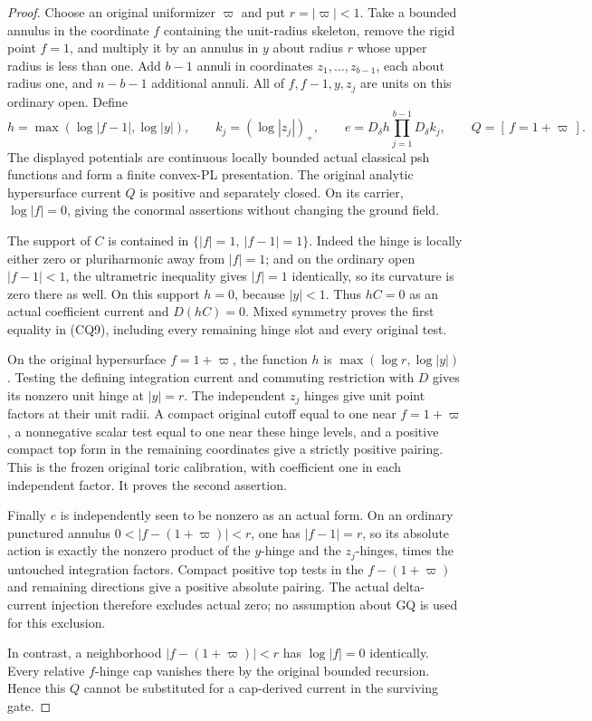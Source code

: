\documentclass[11pt,a4paper]{article}
\numberwithin{equation}{section}
\theoremstyle{definition}
\theoremstyle{remark}
\begin{document}
\begin{proof}
Choose an original uniformizer \(\varpi\) and put \(r=|\varpi|<1\).
Take a bounded annulus in the coordinate \(f\) containing the
unit-radius skeleton, remove the rigid point \(f=1\), and multiply
it by an annulus in \(y\) about radius \(r\) whose upper radius
is less than one. Add \(b-1\) annuli in coordinates
\(z_1,\ldots,z_{b-1}\), each about radius one, and \(n-b-1\)
additional annuli. All of \(f,f-1,y,z_j\) are units on this
ordinary open. Define
\[
 h=\max(\log|f-1|,\log|y|),\qquad
 k_j=(\log|z_j|)_+,\qquad
 e=D_\delta h\prod_{j=1}^{b-1}D_\delta k_j,\qquad
 Q=[\,f=1+\varpi\,].
 \tag{CQ10}
\]
The displayed potentials are continuous locally bounded actual
classical psh functions and form a finite convex-PL presentation.
The original analytic hypersurface current \(Q\) is positive and
separately closed. On its carrier, \(\log|f|=0\), giving the
conormal assertions without changing the ground field.

The support of \(C\) is contained in
\(\{|f|=1,\ |f-1|=1\}\). Indeed the hinge is locally either zero
or pluriharmonic away from \(|f|=1\); and on the ordinary open
\(|f-1|<1\), the ultrametric inequality gives \(|f|=1\)
identically, so its curvature is zero there as well.
On this support \(h=0\), because \(|y|<1\). Thus \(hC=0\)
as an actual coefficient current and \(D(hC)=0\). Mixed symmetry
proves the first equality in (CQ9), including every remaining
hinge slot and every original test.

On the original hypersurface \(f=1+\varpi\), the function \(h\)
is \(\max(\log r,\log|y|)\). Testing the defining integration
current and commuting restriction with \(D\) gives its nonzero
unit hinge at \(|y|=r\). The independent \(z_j\) hinges give
unit point factors at their unit radii. A compact original cutoff
equal to one near \(f=1+\varpi\), a nonnegative scalar test equal
to one near these hinge levels, and a positive compact top form
in the remaining coordinates give a strictly positive pairing.
This is the frozen original toric calibration, with coefficient
one in each independent factor. It proves the second assertion.

Finally \(e\) is independently seen to be nonzero as an actual
form. On an ordinary punctured annulus
\(0<|f-(1+\varpi)|<r\), one has \(|f-1|=r\), so its absolute
action is exactly the nonzero product of the \(y\)-hinge and
the \(z_j\)-hinges, times the untouched integration factors.
Compact positive top tests in the \(f-(1+\varpi)\) and remaining
directions give a positive absolute pairing. The actual
delta-current injection therefore excludes actual zero; no
assumption about GQ is used for this exclusion.

In contrast, a neighborhood \(|f-(1+\varpi)|<r\) has
\(\log|f|=0\) identically. Every relative \(f\)-hinge cap vanishes
there by the original bounded recursion. Hence this \(Q\) cannot
be substituted for a cap-derived current in the surviving gate.
\end{proof}
\end{document}
